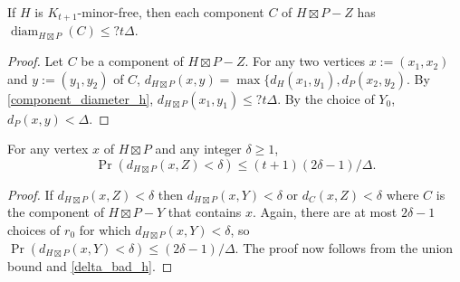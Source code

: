 \documentclass{patmorin}
\renewcommand{\ge}{\geqslant}
\renewcommand{\le}{\leqslant}
\DeclareMathOperator{\diam}{diam}
\begin{document}
\begin{lem}\label{component_diameter}
  If $H$ is $K_{t+1}$-minor-free, then each component $C$ of $H\boxtimes P-Z$ has $\diam_{H\boxtimes P}(C)\le ?t\Delta$.
\end{lem}

\begin{proof}
  Let $C$ be a component of $H\boxtimes P-Z$.  For any two vertices $x:=(x_1,x_2)$ and $y:=(y_1,y_2)$ of $C$, $d_{H\boxtimes P}(x,y) = \max\{d_{H}(x_1,y_1),d_{P}(x_2,y_2)$. By \cref{component_diameter_h},  $d_{H\boxtimes P}(x_1,y_1)\le ?t\Delta$.  By the choice of $Y_0$, $d_{P}(x,y)<\Delta$.
\end{proof}

\begin{lem}\label{delta_bad_product}
  For any vertex $x$ of $H\boxtimes P$ and any integer $\delta\ge 1$, $$\Pr(d_{H\boxtimes P}(x,Z)< \delta)\le (t+1)(2\delta-1)/\Delta.$$
\end{lem}

\begin{proof}
  If $d_{H\boxtimes P}(x,Z)<\delta$ then $d_{H\boxtimes P}(x,Y)<\delta$ or $d_{C}(x,Z)<\delta$ where $C$ is the component of $H\boxtimes P-Y$ that contains $x$.  Again, there are at most $2\delta-1$ choices of $r_0$ for which $d_{H\boxtimes P}(x,Y)<\delta$, so $\Pr(d_{H\boxtimes P}(x,Y)<\delta)\le (2\delta-1)/\Delta$.  The proof now follows from the union bound and \cref{delta_bad_h}.
\end{proof}
\end{document}
